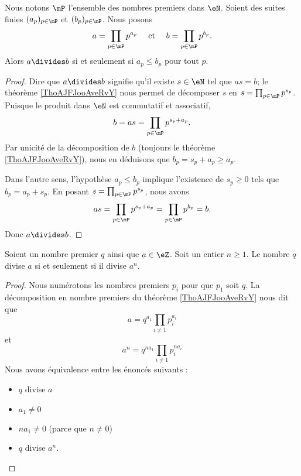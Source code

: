 \begin{lemma}        \label{LEMooDTQQooYoJABt}
	Nous notons \( \mP\) l'ensemble des nombres premiers dans \( \eN\). Soient des suites finies \( (a_p)_{p\in \mP}\) et \( (b_p)_{p\in \mP}\). Nous posons
	\begin{equation}
		\begin{aligned}[]
			a & =\prod_{ p\in\mP}p^{a_p} & \text{ et } &  & b=\prod_{ p\in \mP}p^{b_p}.
		\end{aligned}
	\end{equation}
	Alors \( a\divides b\) si et seulement si \( a_p\leq b_p\) pour tout \( p\).
\end{lemma}

\begin{proof}
	Dire que \( a\divides b\) signifie qu'il existe \( s\in \eN\) tel que \( as=b\); le théorème \ref{ThoAJFJooAveRvY} nous permet de décomposer \( s\) en \( s=\prod_{p\in\mP}p^{s_p}\). Puisque le produit dans \( \eN\) est commutatif et associatif,
	\begin{equation}
		b=as=\prod_{p\in\mP}p^{s_p+a_p}.
	\end{equation}
	Par unicité de la décomposition de \( b\) (toujours le théorème \ref{ThoAJFJooAveRvY}), nous en déduisons que \( b_p=s_p+a_p\geq a_p\).

	Dans l'autre sens, l'hypothèse \( a_p\leq b_p\) implique l'existence de \( s_p\geq 0\) tels que \( b_p=a_p+s_p\). En posant \( s=\prod_{p\in\mP}p^{s_p}\), nous avons
	\begin{equation}
		as=\prod_{p\in\mP}p^{s_p+a_p}=\prod_{p\in \mP}p^{b_p}=b.
	\end{equation}
	Donc \( a\divides b\).
\end{proof}

\begin{lemma}       \label{LEMooGLZHooUcRNgu}
	Soient un nombre premier \( q\) ainsi que \( a\in \eZ\). Soit un entier \( n\geq 1\). Le nombre \( q\) divise \( a\) si et seulement si il divise \( a^n\).
\end{lemma}

\begin{proof}
	Nous numérotons les nombres premiers \( p_i\) pour que \( p_1\) soit \( q\). La décomposition en nombre premiers du théorème \ref{ThoAJFJooAveRvY} nous dit que
	\begin{equation}
		a=q^{a_1}\prod_{i\neq 1}p_i^{a_i}
	\end{equation}
	et
	\begin{equation}
		a^n=q^{na_1}\prod_{i\neq 1}p_i^{na_i}
	\end{equation}
	Nous avons équivalence entre les énoncés suivants :
	\begin{itemize}
		\item \( q\) divise \( a\)
		\item \( a_1\neq 0\)
		\item \( na_1\neq 0\) (parce que \( n\neq 0\))
		\item \( q\) divise \( a^n\).
	\end{itemize}
\end{proof}

